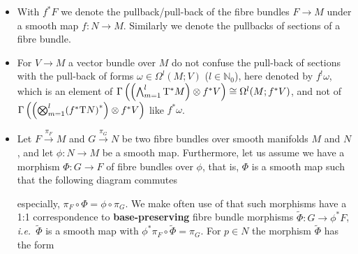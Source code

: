 \documentclass[a4paper,oneside,11pt,bibliography=totoc]{scrartcl}
\def\ba#1\ea{\begin{align}#1\end{align}}
\def\bas#1\eas{\begin{align*}#1\end{align*}}
\theoremstyle{plain}
\theoremstyle{remark}
\theoremstyle{definition}
\begin{document}
\begin{itemize}
	\item With $f^*F$ we denote the pullback/pull-back of the fibre bundles $F \to M$ under a smooth map $f: N \to M$. Similarly we denote the pullbacks of sections of a fibre bundle.
	\item For $V \to M$ a vector bundle over $M$ do not confuse the pull-back of sections with the pull-back of forms $\omega \in \Omega^l(M; V)$ ($l \in \mathbb{N}_0$), here denoted by $f^!\omega$, which is an element of $\Gamma\left( \mleft(\bigwedge_{m=1}^{l} \mathrm{T}^*M \mright) \otimes f^*V \right) \cong \Omega^l(M; f^*V)$, and not of $\Gamma\left( \mleft(\bigotimes_{m=1}^{l} \mleft(f^*\mathrm{T}N\mright)^*\mright) \otimes f^*V \right)$ like $f^*\omega$. 
	\item Let $F \stackrel{\pi_F}{\to} M$ and $G \stackrel{\pi_G}{\to} N$ be two fibre bundles over smooth manifolds $M$ and $N$, and let $\phi: N \to M$ be a smooth map. Furthermore, let us assume we have a morphism $\Phi: G \to F$ of fibre bundles over $\phi$, that is, $\Phi$ is a smooth map such that the following diagram commutes
	\begin{center}
	\end{center}
especially, $\pi_F \circ \Phi = \phi \circ \pi_G$.
We make often use of that such morphisms have a 1:1 correspondence to \textbf{base-preserving} fibre bundle morphisms $\widetilde{\Phi}: G \to \phi^*F$, \textit{i.e.}\ $\widetilde{\Phi}$ is a smooth map with $\phi^*\pi_F \circ \widetilde{\Phi} = \pi_G$. For $p \in N$ the morphism $\widetilde{\Phi}$ has the form

\end{itemize}
\end{document}
